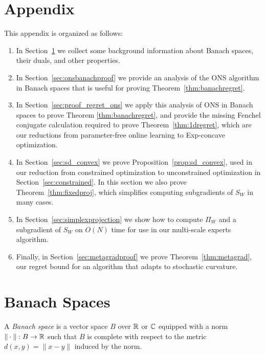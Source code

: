 \documentclass[12pt]{colt2018} %
\begin{document}
{
\small

}

\newpage

\appendix

\section*{Appendix}
This appendix is organized as follows:
\begin{enumerate}
\item In Section~\ref{sec:banachspaces} we collect some background information about Banach spaces, their duals, and other properties.
\item In Section~\ref{sec:onsbanachproof} we provide an analysis of the ONS algorithm in Banach spaces that is useful for proving Theorem~\ref{thm:banachregret}.
\item In Section~\ref{sec:proof_regret_ons} we apply this analysis of ONS in Banach spaces to prove Theorem \ref{thm:banachregret}, and provide the missing Fenchel conjugate calculation required to prove Theorem~\ref{thm:1dregret}, which are our reductions from parameter-free online learning to Exp-concave optimization.
\item In Section~\ref{sec:sd_convex} we prove Proposition~\ref{prop:sd_convex}, used in our reduction from constrained optimization to unconstrained optimization in Section~\ref{sec:constrained}. In this section we also prove Theorem~\ref{thm:fixedproj}, which simplifies computing subgradients of $S_W$ in many cases.
\item In Section~\ref{sec:simplexprojection} we show how to compute $\Pi_W$ and a subgradient of $S_W$ on $O(N)$ time for use in our multi-scale experts algorithm. 
\item Finally, in Section~\ref{sec:metagradproof} we prove Theorem~\ref{thm:metagrad}, our regret bound for an algorithm that adapts to stochastic curvature.
\end{enumerate}

\section{Banach Spaces}
\label{sec:banachspaces}

\begin{Definition}\label{def:banach}
A \emph{Banach space} is a vector space $B$ over $\mathbb{R}$ or $\mathbb{C}$ equipped with a norm $\|\cdot\|:B\to \mathbb{R}$ such that $B$ is complete with respect to the metric $d(x,y) = \|x-y\|$ induced by the norm.
\end{Definition}
\end{document}
